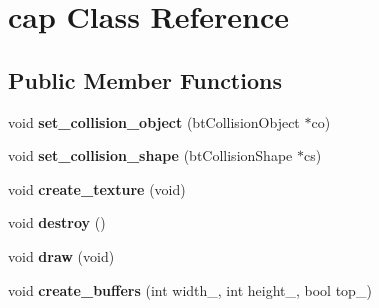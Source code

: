 \hypertarget{classcap}{\section{cap Class Reference}
\label{classcap}
}
\subsection*{Public Member Functions}
\begin{DoxyCompactItemize}
\item 
\hypertarget{classcap_aca9fae4e0be2b93b395b5204ba1392f5}{void {\bfseries set\+\_\+collision\+\_\+object} (bt\+Collision\+Object $\ast$co)}\label{classcap_aca9fae4e0be2b93b395b5204ba1392f5}

\item 
\hypertarget{classcap_a844afc4699d4e7542a19042fe42ca624}{void {\bfseries set\+\_\+collision\+\_\+shape} (bt\+Collision\+Shape $\ast$cs)}\label{classcap_a844afc4699d4e7542a19042fe42ca624}

\item 
\hypertarget{classcap_ac6b2c217628277d94c2da7b18903f1c9}{void {\bfseries create\+\_\+texture} (void)}\label{classcap_ac6b2c217628277d94c2da7b18903f1c9}

\item 
\hypertarget{classcap_a1d15e18f4b476672ff9d4c15f73dd488}{void {\bfseries destroy} ()}\label{classcap_a1d15e18f4b476672ff9d4c15f73dd488}

\item 
\hypertarget{classcap_ac2907eabf158738b4f5e717e9b331519}{void {\bfseries draw} (void)}\label{classcap_ac2907eabf158738b4f5e717e9b331519}

\item 
\hypertarget{classcap_aec2e0032a619a01627c66fa3e761448a}{void {\bfseries create\+\_\+buffers} (int width\+\_\+, int height\+\_\+, bool top\+\_\+)}\label{classcap_aec2e0032a619a01627c66fa3e761448a}

\end{DoxyCompactItemize}
